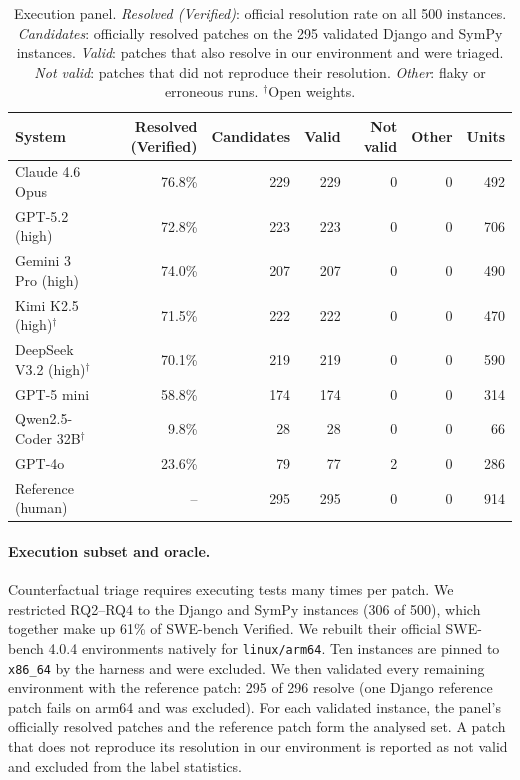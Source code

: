 \documentclass[a4paper,fleqn]{cas-sc}
\newcommand{\lab}[1]{\textsf{#1}}
\begin{document}
\begin{table}[t]
\caption{Execution panel. \emph{Resolved (Verified)}: official resolution rate on all 500 instances. \emph{Candidates}: officially resolved patches on the 295 validated Django and SymPy instances. \emph{Valid}: patches that also resolve in our environment and were triaged. \emph{Not valid}: patches that did not reproduce their resolution. \emph{Other}: flaky or erroneous runs. $^\dagger$Open weights.}
\label{tab:panel}
\centering\footnotesize
\begin{tabular}{lrrrrrr}
\toprule
System & Resolved (Verified) & Candidates & Valid & Not valid & Other & Units \\
\midrule
Claude 4.6 Opus & 76.8\% & 229 & 229 & 0 & 0 & 492 \\
GPT-5.2 (high) & 72.8\% & 223 & 223 & 0 & 0 & 706 \\
Gemini 3 Pro (high) & 74.0\% & 207 & 207 & 0 & 0 & 490 \\
Kimi K2.5 (high)$^\dagger$ & 71.5\% & 222 & 222 & 0 & 0 & 470 \\
DeepSeek V3.2 (high)$^\dagger$ & 70.1\% & 219 & 219 & 0 & 0 & 590 \\
GPT-5 mini & 58.8\% & 174 & 174 & 0 & 0 & 314 \\
Qwen2.5-Coder 32B$^\dagger$ & 9.8\% & 28 & 28 & 0 & 0 & 66 \\
GPT-4o & 23.6\% & 79 & 77 & 2 & 0 & 286 \\
Reference (human) & -- & 295 & 295 & 0 & 0 & 914 \\
\bottomrule
\end{tabular}
\end{table}

\paragraph{Execution subset and oracle.} Counterfactual triage requires executing tests many times per patch. We restricted RQ2--RQ4 to the Django and SymPy instances (306 of 500), which together make up 61\% of SWE-bench Verified. We rebuilt their official SWE-bench 4.0.4 environments natively for \texttt{linux/arm64}. Ten instances are pinned to \texttt{x86\_64} by the harness and were excluded. We then validated every remaining environment with the reference patch: 295 of 296 resolve (one Django reference patch fails on arm64 and was excluded). For each validated instance, the panel's officially resolved patches and the reference patch form the analysed set. A patch that does not reproduce its resolution in our environment is reported as \lab{not valid} and excluded from the label statistics.
\end{document}

